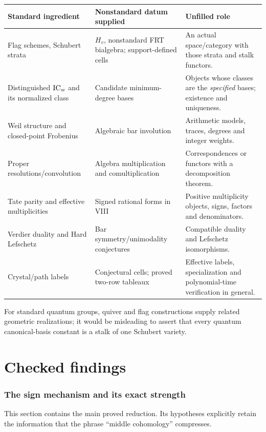 \documentclass[11pt,a4paper]{article}
\theoremstyle{named}\newtheorem{finding}{Finding}[section]
\theoremstyle{definition}\newtheorem{definition}[finding]{Definition}
\theoremstyle{remark}\newtheorem{remark}[finding]{Remark}
\begin{document}
{\small\begin{longtable}{p{.25\linewidth}p{.29\linewidth}p{.38\linewidth}}
\toprule Standard ingredient&Nonstandard datum supplied&Unfilled role\\\midrule\endhead
Flag schemes, Schubert strata&$H_v$, nonstandard FRT bialgebra; support-defined cells&An actual space/category with those strata and stalk functors.\\
Distinguished $\operatorname{IC}_w$ and its normalized class&Candidate minimum-degree bases&Objects whose classes are the \emph{specified} bases; existence and uniqueness.\\
Weil structure and closed-point Frobenius&Algebraic bar involution&Arithmetic models, traces, degrees and integer weights.\\
Proper resolutions/convolution&Algebra multiplication and comultiplication&Correspondences or functors with a decomposition theorem.\\
Tate parity and effective multiplicities&Signed rational forms in VIII&Positive multiplicity objects, signs, factors and denominators.\\
Verdier duality and Hard Lefschetz&Bar symmetry/unimodality conjectures&Compatible duality and Lefschetz isomorphisms.\\
Crystal/path labels&Conjectural cells; proved two-row tableaux&Effective labels, specialization and polynomial-time verification in general.\\\bottomrule
\end{longtable}}
For standard quantum groups, quiver and flag constructions supply related geometric realizations; it would be misleading to assert that every quantum canonical-basis constant is a stalk of one Schubert variety.

\part{Checked findings}
\section{The sign mechanism and its exact strength}\label{sec:main}
This section contains the main proved reduction. Its hypotheses explicitly retain the information that the phrase ``middle cohomology'' compresses.
\end{document}
